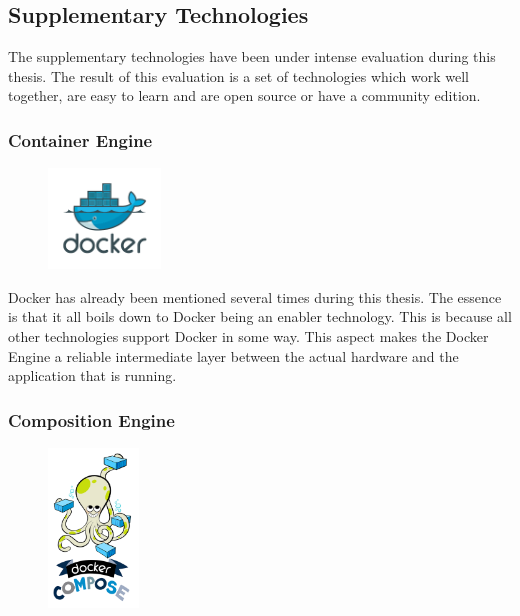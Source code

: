 \subsection{Supplementary Technologies}

The supplementary technologies have been under intense evaluation during this
thesis. The result of this evaluation is a set of technologies which work well
together, are easy to learn and are open source or have a community edition.

\subsubsection{Container Engine}

\begin{figure}
	\vspace*{-0.5cm} \hspace*{0.2cm}
    \includegraphics[width=3cm]{images/dependencies/docker}
\end{figure}

Docker has already been mentioned several times during this thesis. The
essence is that it all boils down to Docker being an enabler technology.
This is because all other technologies support Docker in some way. This
aspect makes the Docker Engine a reliable intermediate layer between the
actual hardware and the application that is running. 


\subsubsection{Composition Engine}

\begin{figure}
	\vspace*{-0.5cm} \hspace*{0.4cm}
    \includegraphics[width=2.4cm]{images/dependencies/docker-compose}
\end{figure}

